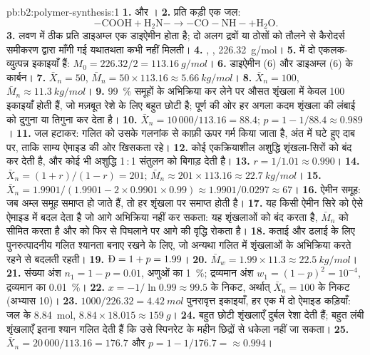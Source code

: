 \begin{solution}{pb:b2:polymer-synthesis:1}
\textbf{1.}  और ।
\textbf{2.} प्रति कड़ी एक जल:
\[\mathrm{{-}COOH + H_2N{-} \longrightarrow {-}CO{-}NH{-} + H_2O}.\]
\textbf{3.} लवण में ठीक प्रति डाइअम्ल एक डाइऐमीन होता है; दो अलग द्रवों या ठोसों को तौलने से
कैरोदर्स समीकरण द्वारा माँगी गई यथातथता कभी नहीं मिलती।
\textbf{4.} \ce{-[NH(CH2)6NH-CO(CH2)4CO]-}, , \qty{226.32}{g/mol}।
\textbf{5.}  में दो एकलक-व्युत्पन्न इकाइयाँ हैं: $M_0 = 226.32/2 = \qty{113.16}{g/mol}$।
\textbf{6.} डाइऐमीन (6) और डाइअम्ल (6) के कार्बन।
\textbf{7.} $\bar X_n = 50$, $\bar M_n = 50 \times 113.16 \approx \qty{5.66}{kg/mol}$।
\textbf{8.} $\bar X_n = 100$, $\bar M_n \approx \qty{11.3}{kg/mol}$।
\textbf{9.} 99~\% समूहों के अभिक्रिया कर लेने पर औसत शृंखला में केवल 100 इकाइयाँ होती हैं, जो
मज़बूत रेशे के लिए बहुत छोटी है; पूर्ण  की ओर हर अगला कदम शृंखला की लंबाई को दुगुना या तिगुना कर देता है।
\textbf{10.} $\bar X_n = 10\,000/113.16 = 88.4$; $p = 1 - 1/88.4 \approx 0.989$।
\textbf{11.} जल हटाकर: गलित को उसके गलनांक से काफ़ी ऊपर गर्म किया जाता है, अंत में घटे हुए
दाब पर, ताकि साम्य ऐमाइड की ओर खिसकता रहे।
\textbf{12.} कोई एकक्रियाशील अशुद्धि शृंखला-सिरों को बंद कर देती है, और कोई भी अशुद्धि 1\,:\,1 संतुलन को बिगाड़ देती है।
\textbf{13.} $r = 1/1.01 \approx 0.990$।
\textbf{14.} $\bar X_n = (1+r)/(1-r) = 201$; $\bar M_n \approx 201 \times 113.16 \approx
\qty{22.7}{kg/mol}$।
\textbf{15.} $\bar X_n = 1.9901/(1.9901 - 2 \times 0.9901 \times 0.99) \approx 1.9901/0.0297 \approx
67$।
\textbf{16.} ऐमीन समूह: जब अम्ल समूह समाप्त हो जाते हैं, तो हर शृंखला  पर समाप्त होती है।
\textbf{17.} यह किसी ऐमीन सिरे को ऐसे ऐमाइड में बदल देता है जो आगे अभिक्रिया नहीं कर सकता: यह शृंखलाओं को बंद करता है,
$\bar M_n$ को सीमित करता है और  को फिर से पिघलाने पर आगे की वृद्धि रोकता है।
\textbf{18.} कताई और ढलाई के लिए पुनरुत्पादनीय गलित श्यानता बनाए रखने के लिए, जो अन्यथा
गलित में शृंखलाओं के अभिक्रिया करते रहने से बदलती रहती।
\textbf{19.} $\text{\DH} = 1 + p = 1.99$।
\textbf{20.} $\bar M_w = 1.99 \times 11.3 \approx \qty{22.5}{kg/mol}$।
\textbf{21.} संख्या अंश $n_1 = 1 - p = 0.01$, अणुओं का 1~\%; द्रव्यमान अंश $w_1 = (1-p)^2 =
10^{-4}$, द्रव्यमान का 0.01~\%।
\textbf{22.} $x = -1/\ln 0.99 \approx 99.5$ के निकट, अर्थात् $\bar X_n = 100$ के निकट (अभ्यास 10)।
\textbf{23.} $1000/226.32 = \qty{4.42}{mol}$ पुनरावृत्त इकाइयाँ, हर एक में दो ऐमाइड कड़ियाँ: जल के \qty{8.84}{mol},
$8.84 \times 18.015 \approx \qty{159}{g}$।
\textbf{24.} बहुत छोटी शृंखलाएँ दुर्बल रेशा देती हैं; बहुत लंबी शृंखलाएँ इतना श्यान गलित देती हैं कि उसे
स्पिनरेट के महीन छिद्रों से धकेला नहीं जा सकता।
\textbf{25.} $\bar X_n = 20\,000/113.16 = 176.7$ और $p = 1 - 1/176.7 = \boldsymbol{\approx 0.994}$।
\end{solution}
